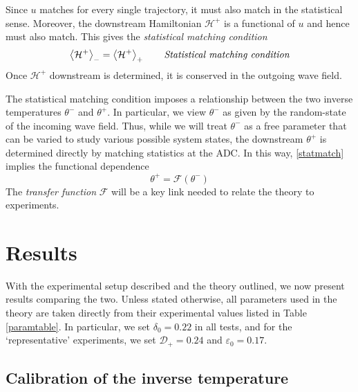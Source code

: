 \documentclass[11pt]{article}
\newcommand{\mean}[1]{\left< #1 \right>}
\newcommand{\eps}{\varepsilon}
\newcommand{\drat}{\mathcal{D}}
\newcommand{\dratdn}{\drat_+}
\newcommand{\epsup}{\eps_0}
\newcommand{\delup}{\delta_0}
\newcommand{\Ham}{\mathcal{H}}
\newcommand{\Hdn}{\Ham^{+}}
\newcommand{\thup}{\theta^{-}}
\newcommand{\thdn}{\theta^{+}}
\newcommand{\meanup}[1]{\mean{#1}_{-}}
\newcommand{\meandn}[1]{\mean{#1}_{+}}
\newcommand{\transf}{\mathcal{F}}
\begin{document}
Since $u$ matches for every single trajectory, it must also match in the statistical sense. Moreover, the downstream Hamiltonian $\Hdn$ is a functional of $u$ and hence must also match. This gives the {\em statistical matching condition}
\begin{align}
\label{statmatch}
\meanup{\Hdn} = \meandn{\Hdn}
\qquad \mbox{\em Statistical matching condition}
\end{align}
Once $\Hdn$ downstream is determined, it is conserved in the outgoing wave field.

The statistical matching condition imposes a relationship between the two inverse temperatures $\thup$ and $\thdn$. In particular, we view $\thup$ as given by the random-state of the incoming wave field. Thus, while we will treat $\thup$ as a free parameter that can be varied to study various possible system states, the downstream $\thdn$ is determined directly by matching statistics at the ADC. In this way, \eqref{statmatch} implies the functional dependence
\begin{equation}
\thdn = \transf \left( \thup \right)
\end{equation}
The {\em transfer function} $\transf$ will be a key link needed to relate the theory to experiments.


\section{Results}

With the experimental setup described and the theory outlined, we now present results comparing the two. Unless stated otherwise, all parameters used in the theory are taken directly from their experimental values listed in Table \ref{paramtable}. In particular, we set $\delup = 0.22$ in all tests, and for the `representative' experiments, we set $\dratdn = 0.24$ and $\epsup = 0.17$. 

\subsection{Calibration of the inverse temperature}
\end{document}
